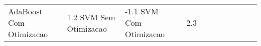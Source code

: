 \begin{table}[H]
\begin{adjustwidth}{ -1in }{ -1in }
\begin{tabular}{lllllllllll}
           AdaBoost Com Otimizacao &       1.2%
                SVM Sem Otimizacao &      -1.1%
                SVM Com Otimizacao &      -2.3%
\bottomrule
\end{tabular}
    \end{adjustwidth}
    \renewcommand{\arraystretch}{1.0} %
\end{table}
